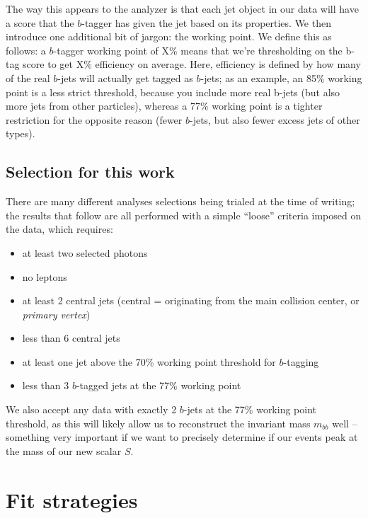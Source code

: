 \documentclass[
  11pt,
  numbers=noendperiod]{book}
\providecommand{\tightlist}{%
  \setlength{\itemsep}{0pt}\setlength{\parskip}{0pt}}\usepackage{longtable,booktabs,array}
\begin{document}
The way this appears to the analyzer is that each jet object in our data
will have a score that the \(b\)-tagger has given the jet based on its
properties. We then introduce one additional bit of jargon: the working point. We define this as follows: a $b$-tagger working point of X\% means that we're thresholding on the b-tag score to get X\% efficiency on average. Here, efficiency is defined by how many of the real $b$-jets will actually get tagged as $b$-jets; as an example, an 85\% working point is a less strict threshold, because you include more real b-jets (but also more jets from other particles), whereas a 77\% working point is a tighter restriction for the opposite reason (fewer $b$-jets, but also fewer excess jets of other types).

\hypertarget{selection-for-this-work}{%
\subsection{Selection for this work}\label{selection-for-this-work}}

There are many different analyses selections being trialed at the time
of writing; the results that follow are all performed with a simple
``loose'' criteria imposed on the data, which requires:

\begin{itemize}
\tightlist
\item
  at least two selected photons
\item
  no leptons
\item
  at least 2 central jets (central = originating from the main collision
  center, or \emph{primary vertex})
\item
  less than 6 central jets
\item
  at least one jet above the 70\% working point threshold for
  \(b\)-tagging
\item
  less than 3 \(b\)-tagged jets at the 77\% working point
\end{itemize}

We also accept any data with exactly 2 \(b\)-jets at the 77\% working
point threshold, as this will likely allow us to reconstruct the
invariant mass \(m_{bb}\) well -- something very important if we want to
precisely determine if our events peak at the mass of our new scalar
\(S\).

\hypertarget{sec-fit-strategies}{%
\section{Fit strategies}\label{sec-fit-strategies}}
\end{document}
